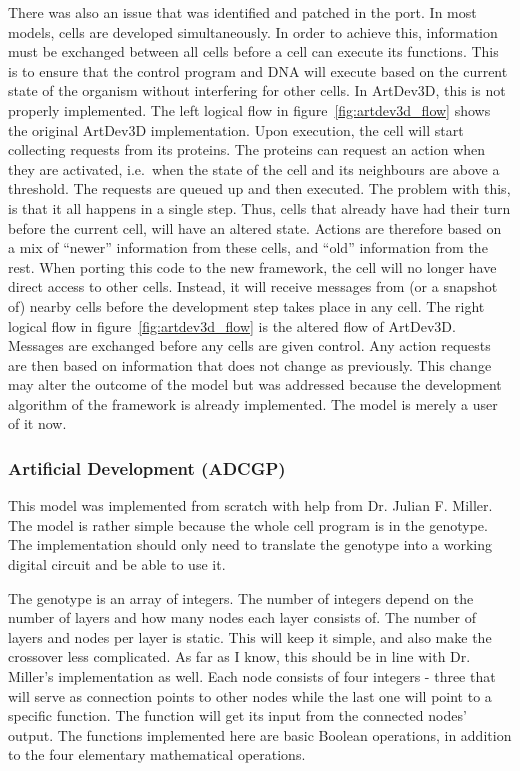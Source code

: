 There was also an issue that was identified and patched in the port. In most models, cells are developed simultaneously. In order to achieve this, information must be exchanged between all cells before a cell can execute its functions. This is to ensure that the control program and DNA will execute based on the current state of the organism without interfering for other cells. In ArtDev3D, this is not properly implemented. The left logical flow in figure~\ref{fig:artdev3d_flow} shows the original ArtDev3D implementation. Upon execution, the cell will start collecting requests from its proteins. The proteins can request an action when they are activated, i.e.\ when the state of the cell and its neighbours are above a threshold. The requests are queued up and then executed. The problem with this, is that it all happens in a single step. Thus, cells that already have had their turn before the current cell, will have an altered state. Actions are therefore based on a mix of ``newer'' information from these cells, and ``old'' information from the rest. When porting this code to the new framework, the cell will no longer have direct access to other cells. Instead, it will receive messages from (or a snapshot of) nearby cells before the development step takes place in any cell. The right logical flow in figure~\ref{fig:artdev3d_flow} is the altered flow of ArtDev3D. Messages are exchanged before any cells are given control. Any action requests are then based on information that does not change as previously. This change may alter the outcome of the model but was addressed because the development algorithm of the framework is already implemented. The model is merely a user of it now.


\subsubsection{Artificial Development (ADCGP)}
\label{sec:cartesian}
This model was implemented from scratch with help from Dr. Julian F. Miller. The model is rather simple because the whole cell program is in the genotype. The implementation should only need to translate the genotype into a working digital circuit and be able to use it.

The genotype is an array of integers. The number of integers depend on the number of layers and how many nodes each layer consists of. The number of layers and nodes per layer is static. This will keep it simple, and also make the crossover less complicated. As far as I know, this should be in line with Dr. Miller's implementation as well. Each node consists of four integers - three that will serve as connection points to other nodes while the last one will point to a specific function. The function will get its input from the connected nodes' output. The functions implemented here are basic Boolean operations, in addition to the four elementary mathematical operations.

